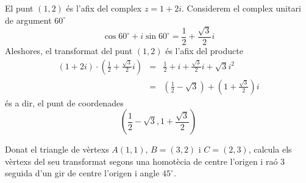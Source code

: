 \begin{solucio}
El punt $(1,2)$ és l’afix del complex $z=1+2i$. Considerem el complex
unitari de argument $60
^{\circ}
$
\begin{equation*}
\cos 60
^{\circ}
+i\sin 60
^{\circ}
=\frac{1}{2}+\frac{\sqrt{3}}{2}i
\end{equation*}
Aleshores, el transformat del punt $(1,2)$ és l’afix del producte
\begin{eqnarray*}
(1+2i)\cdot \left( \frac{1}{2}+\frac{\sqrt{3}}{2}i\right) &=&\frac{1}{2}+i+
\frac{\sqrt{3}}{2}i+\sqrt{3}i^{2} \\
&=&\left( \frac{1}{2}-\sqrt{3}\right) +\left( 1+\frac{\sqrt{3}}{2}\right) i
\end{eqnarray*}
és a dir, el punt de coordenades
\begin{equation*}
\left( \frac{1}{2}-\sqrt{3},1+\frac{\sqrt{3}}{2}\right)
\end{equation*}
\end{solucio}

\begin{exemple}
Donat el triangle de vèrtexs $A(1,1)$, $B=(3,2)$ i $C=(2,3)$,
calcula els vèrtexs del seu transformat segons una homotècia de
centre l’origen i raó $3$ seguida d’un gir de centre l’origen i
angle $45
^{\circ}
$.
\end{exemple}

